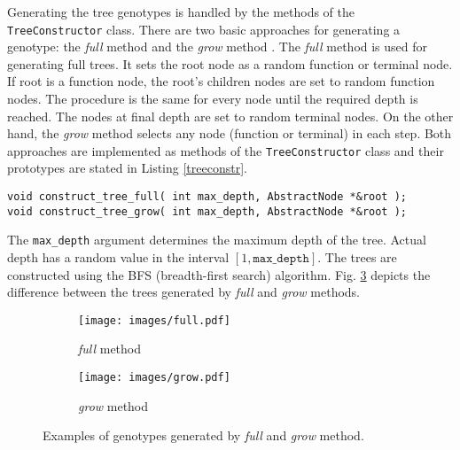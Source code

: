 Generating the tree genotypes is handled by the methods of the \texttt{TreeConstructor} class.
There are two basic approaches for generating a genotype: the \textit{full} method and the \textit{grow} method \cite{koza1992genetic}.
The \textit{full} method is used for generating full trees. 
It sets the root node as a random function or terminal node.
If root is a function node, the root's children nodes are set to random function nodes.
The procedure is the same for every node until the required depth is reached.
The nodes at final depth are set to random terminal nodes.
On the other hand, the \textit{grow} method selects any node (function or terminal) in each step.
Both approaches are implemented as methods of the \texttt{TreeConstructor} class and their prototypes are stated in Listing \ref{treeconstr}.
\begin{lstlisting}[frame=none, label={treeconstr}, caption={Functions for implementing the \textit{full} and \textit{grow} methods for creating a genotype.}, captionpos=b]
void construct_tree_full( int max_depth, AbstractNode *&root );
void construct_tree_grow( int max_depth, AbstractNode *&root );
\end{lstlisting}
The \texttt{max\_depth} argument determines the maximum depth of the tree.
Actual depth has a random value in the interval $[1, \texttt{max\_depth}]$.
The trees are constructed using the BFS (breadth-first search) algorithm.
Fig. \ref{fullgrow} depicts the difference between the trees generated by \textit{full} and \textit{grow} methods.
\begin{figure}[H]
\centering
\begin{subfigure}{.5\textwidth}
\begin{flushleft}
  \centering
  \texttt{[image: images/full.pdf]}
  \caption{\textit{full} method}
  \label{ecf_genotypes}
\end{flushleft}
\end{subfigure}
\begin{subfigure}{.3\textwidth}
\begin{flushright}
  \centering
  \texttt{[image: images/grow.pdf]}
  \caption{\textit{grow} method}
  \label{impl_genotype}
\end{flushright}
\end{subfigure}
\caption{Examples of genotypes generated by \textit{full} and \textit{grow} method.}
\label{fullgrow}
\end{figure}

